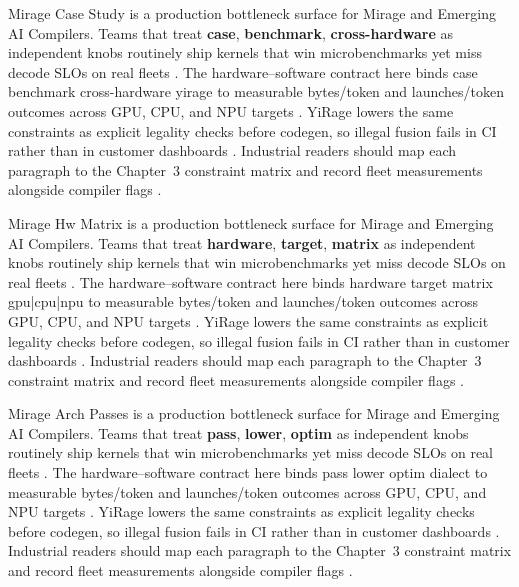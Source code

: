Mirage Case Study is a production bottleneck surface for Mirage and Emerging AI Compilers. Teams that treat \textbf{case}, \textbf{benchmark}, \textbf{cross-hardware} as independent knobs routinely ship kernels that win microbenchmarks yet miss decode SLOs on real fleets \citep{semianalysis2024tma,dlbook}. The hardware--software contract here binds case benchmark cross-hardware yirage to measurable bytes/token and launches/token outcomes across GPU, CPU, and NPU targets \citep{amd2024xdna,dao2022flashattention}. YiRage lowers the same constraints as explicit legality checks before codegen, so illegal fusion fails in CI rather than in customer dashboards \citep{amd2024aie,kwon2023vllm}. Industrial readers should map each paragraph to the Chapter~3 constraint matrix and record fleet measurements alongside compiler flags \citep{dlbook,nvidia2024cudagraphs}.

Mirage Hw Matrix is a production bottleneck surface for Mirage and Emerging AI Compilers. Teams that treat \textbf{hardware}, \textbf{target}, \textbf{matrix} as independent knobs routinely ship kernels that win microbenchmarks yet miss decode SLOs on real fleets \citep{amd2024xdna,dao2022flashattention}. The hardware--software contract here binds hardware target matrix gpu|cpu|npu to measurable bytes/token and launches/token outcomes across GPU, CPU, and NPU targets \citep{amd2024aie,kwon2023vllm}. YiRage lowers the same constraints as explicit legality checks before codegen, so illegal fusion fails in CI rather than in customer dashboards \citep{dlbook,nvidia2024cudagraphs}. Industrial readers should map each paragraph to the Chapter~3 constraint matrix and record fleet measurements alongside compiler flags \citep{dao2022flashattention,liu2024deepseekv3}.

Mirage Arch Passes is a production bottleneck surface for Mirage and Emerging AI Compilers. Teams that treat \textbf{pass}, \textbf{lower}, \textbf{optim} as independent knobs routinely ship kernels that win microbenchmarks yet miss decode SLOs on real fleets \citep{amd2024aie,kwon2023vllm}. The hardware--software contract here binds pass lower optim dialect to measurable bytes/token and launches/token outcomes across GPU, CPU, and NPU targets \citep{dlbook,nvidia2024cudagraphs}. YiRage lowers the same constraints as explicit legality checks before codegen, so illegal fusion fails in CI rather than in customer dashboards \citep{dao2022flashattention,liu2024deepseekv3}. Industrial readers should map each paragraph to the Chapter~3 constraint matrix and record fleet measurements alongside compiler flags \citep{kwon2023vllm,patel2025llminference}.

